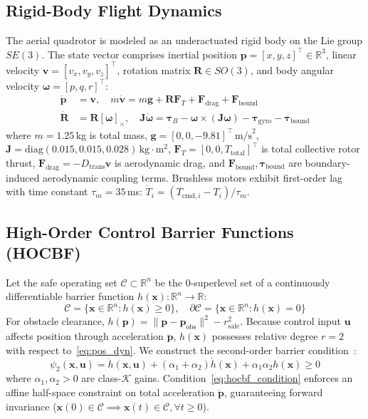 \documentclass[journal,10pt]{IEEEtran}
\begin{document}
\subsection{Rigid-Body Flight Dynamics}
The aerial quadrotor is modeled as an underactuated rigid body on the Lie group $SE(3)$. The state vector comprises inertial position $\mathbf{p} = [x, y, z]^\top \in \mathbb{R}^3$, linear velocity $\mathbf{v} = [v_x, v_y, v_z]^\top$, rotation matrix $\mathbf{R} \in SO(3)$, and body angular velocity $\boldsymbol{\omega} = [p, q, r]^\top$:
\begin{align}
\dot{\mathbf{p}} &= \mathbf{v}, \quad m\dot{\mathbf{v}} = m\mathbf{g} + \mathbf{R} \mathbf{F}_T + \mathbf{F}_{\text{drag}} + \mathbf{F}_{\text{bound}} \label{eq:pos_dyn} \\
\dot{\mathbf{R}} &= \mathbf{R}[\boldsymbol{\omega}]_\times, \quad \mathbf{J}\dot{\boldsymbol{\omega}} = \boldsymbol{\tau}_B - \boldsymbol{\omega} \times (\mathbf{J}\boldsymbol{\omega}) - \boldsymbol{\tau}_{\text{gyro}} - \boldsymbol{\tau}_{\text{bound}} \label{eq:att_dyn}
\end{align}
where $m = 1.25\,$kg is total mass, $\mathbf{g} = [0, 0, -9.81]^\top\,\text{m/s}^2$, $\mathbf{J} = \mathrm{diag}(0.015, 0.015, 0.028)\,\text{kg}\cdot\text{m}^2$, $\mathbf{F}_T = [0, 0, T_{\text{total}}]^\top$ is total collective rotor thrust, $\mathbf{F}_{\text{drag}} = -D_{\text{trans}} \mathbf{v}$ is aerodynamic drag, and $\mathbf{F}_{\text{bound}}, \boldsymbol{\tau}_{\text{bound}}$ are boundary-induced aerodynamic coupling terms. Brushless motors exhibit first-order lag with time constant $\tau_m = 35\,$ms: $\dot{T}_i = (T_{\text{cmd}, i} - T_i)/\tau_m$.

\subsection{High-Order Control Barrier Functions (HOCBF)}
Let the safe operating set $\mathcal{C} \subset \mathbb{R}^n$ be the 0-superlevel set of a continuously differentiable barrier function $h(\mathbf{x}): \mathbb{R}^n \to \mathbb{R}$:
\begin{equation}
\mathcal{C} = \{\mathbf{x} \in \mathbb{R}^n : h(\mathbf{x}) \ge 0\}, \quad \partial\mathcal{C} = \{\mathbf{x} \in \mathbb{R}^n : h(\mathbf{x}) = 0\}
\end{equation}
For obstacle clearance, $h(\mathbf{p}) = \|\mathbf{p} - \mathbf{p}_{\text{obs}}\|^2 - r_{\text{safe}}^2$. Because control input $\mathbf{u}$ affects position through acceleration $\ddot{\mathbf{p}}$, $h(\mathbf{x})$ possesses relative degree $r = 2$ with respect to~\eqref{eq:pos_dyn}. We construct the second-order barrier condition~\cite{ames2019control}:
\begin{equation}
\psi_2(\mathbf{x}, \mathbf{u}) = \ddot{h}(\mathbf{x}, \mathbf{u}) + (\alpha_1 + \alpha_2)\dot{h}(\mathbf{x}) + \alpha_1 \alpha_2 h(\mathbf{x}) \ge 0
\label{eq:hocbf_condition}
\end{equation}
where $\alpha_1, \alpha_2 > 0$ are class-$\mathcal{K}$ gains. Condition~\eqref{eq:hocbf_condition} enforces an affine half-space constraint on total acceleration $\ddot{\mathbf{p}}$, guaranteeing forward invariance ($\mathbf{x}(0) \in \mathcal{C} \implies \mathbf{x}(t) \in \mathcal{C}, \forall t \ge 0$).
\end{document}
